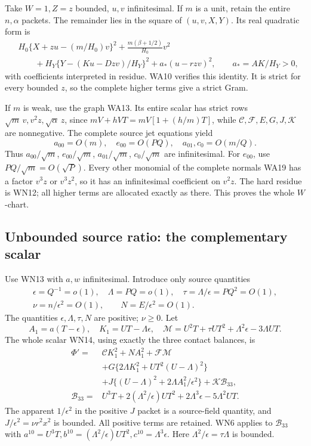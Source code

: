 Take \(W=1,Z=z\) bounded, \(u,v\) infinitesimal. If \(m\) is a
unit, retain the entire \(n,\alpha\) packets. The remainder lies
in the square of \((u,v,X,Y)\). Its real quadratic form is
\[
\begin{split}
 &H_0\{X+zu-(m/H_0)v\}^2+
       \frac{m(\beta+1/2)}{H_0}v^2\\
 &\qquad+H_Y\{Y-(Ku-Dzv)/H_Y\}^2
       +a_*(u-rzv)^2,\qquad a_*=AK/H_Y>0,
\end{split}\tag{WN19}
\]
with coefficients interpreted in residue. WA10 verifies this
identity. It is strict for every bounded \(z\), so the complete
higher terms give a strict Gram.

If \(m\) is weak, use the graph WA13. Its entire scalar has strict
rows \(\sqrt m\,v,v^2z,\sqrt\alpha\,z\), since
\(mV+hVT=mV[1+(h/m)T]\), while \(\mathcal C,\mathcal F,E,G,J,\mathcal K\)
are nonnegative. The complete source jet equations yield
\[
 a_{00}=O(m),\quad e_{00}=O(PQ),\quad
 a_{01},c_0=O(m/Q).
 \tag{WN20}
\]
Thus \(a_{00}/\sqrt m\), \(e_{00}/\sqrt m\),
\(a_{01}/\sqrt m\), \(c_0/\sqrt m\) are infinitesimal.
For \(e_{00}\), use \(PQ/\sqrt m=O(\sqrt P)\).
Every other monomial of the complete normals WA19 has a factor
\(v^3z\) or \(v^3z^2\), so it has an infinitesimal coefficient
on \(v^2z\). The hard residue is WN12; all higher terms are
allocated exactly as there. This proves the whole \(W\)-chart.

\subsection{Unbounded source ratio: the complementary scalar}

Use WN13 with \(a,w\) infinitesimal. Introduce only source quantities
\[
\begin{gathered}
 \epsilon=Q^{-1}=o(1),\quad \Lambda=PQ=o(1),\quad
 \tau=\Lambda/\epsilon=PQ^2=O(1),\\
 \nu=n/\epsilon^2=O(1),\qquad N=E/\epsilon^2=O(1).
\end{gathered}\tag{WN21}
\]
The quantities \(\epsilon,\Lambda,\tau,N\) are positive; \(\nu\geq0\).
Let
\[
 A_1=a(T-\epsilon),\quad K_1=UT-\Lambda\epsilon,\quad
 \mathcal M=U^2T+\tau UT^2+\Lambda^2\epsilon-3\Lambda UT .
 \tag{WN22}
\]
The whole scalar WN14, using exactly the three contact balances, is
\[
\begin{split}
 \Phi'={}&\mathcal C K_1^2+NA_1^2+\mathcal F\mathcal M\\
 &+G\{2\Lambda K_1^2+UT^2(U-\Lambda)^2\}\\
 &+J\{(U-\Lambda)^2+2\Lambda A_1^2/\epsilon^2\}
       +\mathcal K\mathcal B_{33},\\
 \mathcal B_{33}={}&U^3T+2(\Lambda^2/\epsilon)UT^2
                      +2\Lambda^3\epsilon-5\Lambda^2UT .
\end{split}\tag{WN23}
\]
The apparent \(1/\epsilon^2\) in the positive \(J\) packet is
a source-field quantity, and \(J/\epsilon^2=\nu r^2x^2\) is bounded.
All positive terms are retained. WN6 applies to \(\mathcal B_{33}\)
with \(a^{10}=U^3T,b^{10}=(\Lambda^2/\epsilon)UT^2,
c^{10}=\Lambda^3\epsilon\).
Here \(\Lambda^2/\epsilon=\tau\Lambda\) is bounded.

